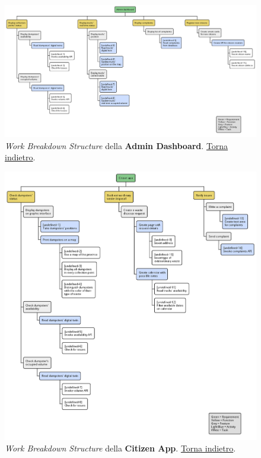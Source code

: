 \begin{figure}[H]
    \centering
    \includegraphics[width=\textwidth]{uml/wbs-admin-dashboard.pm}
    \caption{\textit{Work Breakdown Structure} della \textbf{Admin Dashboard}. \hyperlink{back:uml/wbs-admin-dashboard}{Torna indietro}.}
    \label{fig:uml/wbs-admin-dashboard}
\end{figure}


\begin{figure}[H]
    \centering
    \includegraphics[width=\textwidth]{uml/wbs-citizen-app.pm}
    \caption{\textit{Work Breakdown Structure} della \textbf{Citizen App}. \hyperlink{back:uml/wbs-citizen-app}{Torna indietro}.}
    \label{fig:uml/wbs-citizen-app}
\end{figure}


